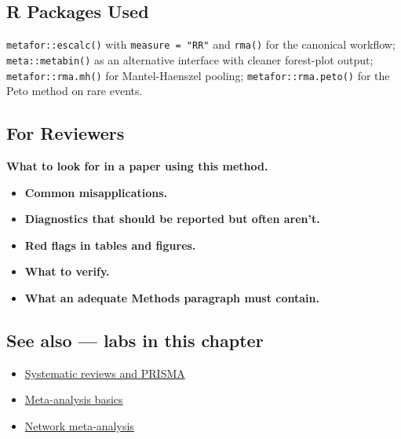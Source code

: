 \documentclass[
]{article}
\providecommand{\tightlist}{%
  \setlength{\itemsep}{0pt}\setlength{\parskip}{0pt}}
\begin{document}
\subsection{R Packages Used}\label{r-packages-used}

\texttt{metafor::escalc()} with \texttt{measure\ =\ "RR"} and
\texttt{rma()} for the canonical workflow; \texttt{meta::metabin()} as
an alternative interface with cleaner forest-plot output;
\texttt{metafor::rma.mh()} for Mantel-Haenszel pooling;
\texttt{metafor::rma.peto()} for the Peto method on rare events.

\subsection{For Reviewers}\label{for-reviewers}

\textbf{What to look for in a paper using this method.}

\begin{itemize}
\tightlist
\item
  \textbf{Common misapplications.}
\item
  \textbf{Diagnostics that should be reported but often aren't.}
\item
  \textbf{Red flags in tables and figures.}
\item
  \textbf{What to verify.}
\item
  \textbf{What an adequate Methods paragraph must contain.}
\end{itemize}

\subsection{See also --- labs in this
chapter}\label{see-also-labs-in-this-chapter}

\begin{itemize}
\tightlist
\item
  \href{labs/lab-systematic-reviews-and-prisma.Rmd}{Systematic reviews
  and PRISMA}
\item
  \href{labs/lab-meta-analysis-basics.Rmd}{Meta-analysis basics}
\item
  \href{labs/lab-network-meta-analysis.Rmd}{Network meta-analysis}
\end{itemize}
\end{document}
